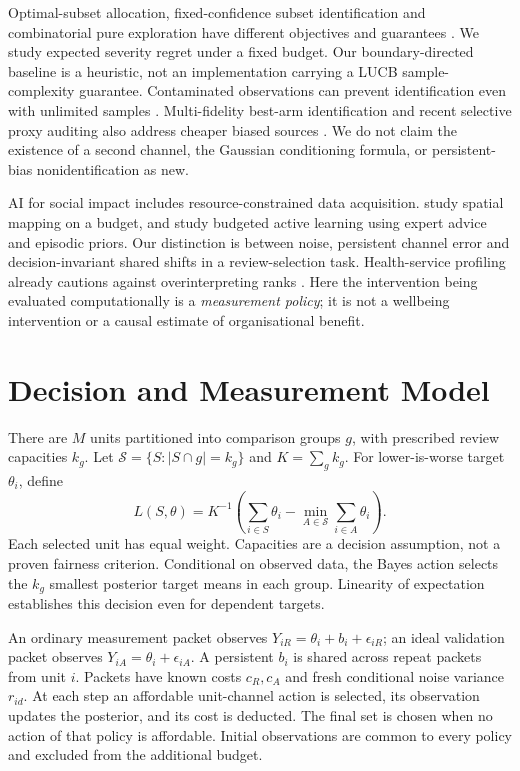 Optimal-subset allocation, fixed-confidence subset identification and combinatorial pure exploration have different objectives and guarantees \citep{chen2008subset,kalyanakrishnan2012pac,chen2014combinatorial}. We study expected severity regret under a fixed budget. Our boundary-directed baseline is a heuristic, not an implementation carrying a LUCB sample-complexity guarantee. Contaminated observations can prevent identification even with unlimited samples \citep{altschuler2019contaminated}. Multi-fidelity best-arm identification and recent selective proxy auditing also address cheaper biased sources \citep{poiani2024optimal,ao2026judges}. We do not claim the existence of a second channel, the Gaussian conditioning formula, or persistent-bias nonidentification as new.

AI for social impact includes resource-constrained data acquisition. \citet{dom_betti2026} study spatial mapping on a budget, and \citet{dom_goebel2026} study budgeted active learning using expert advice and episodic priors. Our distinction is between noise, persistent channel error and decision-invariant shared shifts in a review-selection task. Health-service profiling already cautions against overinterpreting ranks \citep{goldstein1996league,lin2006ranking}. Here the intervention being evaluated computationally is a \emph{measurement policy}; it is not a wellbeing intervention or a causal estimate of organisational benefit.

\section{Decision and Measurement Model}
\label{sec:model}
There are $M$ units partitioned into comparison groups $g$, with prescribed review capacities $k_g$. Let $\mathcal S=\{S:|S\cap g|=k_g\}$ and $K=\sum_g k_g$. For lower-is-worse target $\theta_i$, define
\begin{equation}
 L(S,\theta)=K^{-1}\left(\sum_{i\in S}\theta_i-\min_{A\in\mathcal S}\sum_{i\in A}\theta_i\right).
 \label{eq:lossmain}
\end{equation}
Each selected unit has equal weight. Capacities are a decision assumption, not a proven fairness criterion. Conditional on observed data, the Bayes action selects the $k_g$ smallest posterior target means in each group. Linearity of expectation establishes this decision even for dependent targets.

An ordinary measurement packet observes $Y_{iR}=\theta_i+b_i+\epsilon_{iR}$; an ideal validation packet observes $Y_{iA}=\theta_i+\epsilon_{iA}$. A persistent $b_i$ is shared across repeat packets from unit $i$. Packets have known costs $c_R,c_A$ and fresh conditional noise variance $r_{id}$. At each step an affordable unit-channel action is selected, its observation updates the posterior, and its cost is deducted. The final set is chosen when no action of that policy is affordable. Initial observations are common to every policy and excluded from the additional budget.

